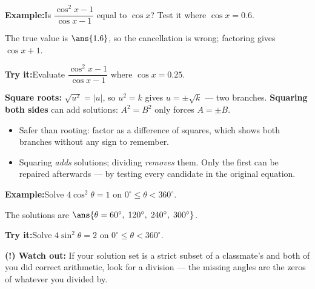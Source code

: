 \documentclass[12pt]{article}
\begin{document}
\begin{examplebox}
\textbf{Example:}\quad Is $\dfrac{\cos^2 x - 1}{\cos x - 1}$ equal to $\cos x$?
Test it where $\cos x = 0.6$.

The true value is $\ans{1.6}$, so the cancellation is wrong; factoring gives
$\cos x + 1$.
\end{examplebox}

\begin{tryitbox}
\textbf{Try it:}\quad Evaluate $\dfrac{\cos^2 x - 1}{\cos x - 1}$ where
$\cos x = 0.25$.\\[2pt]
\end{tryitbox}


\begin{formulabox}
\textbf{Square roots:} $\sqrt{u^2} = |u|$, so $u^2 = k$ gives
$u = \pm\sqrt{k}$ --- two branches. \qquad
\textbf{Squaring both sides} can add solutions: $A^2 = B^2$ only forces
$A = \pm B$.
\begin{itemize}[leftmargin=0.8cm, itemsep=1pt, topsep=2pt]
  \item Safer than rooting: factor as a difference of squares, which shows both
        branches without any sign to remember.
  \item Squaring \emph{adds} solutions; dividing \emph{removes} them. Only the
        first can be repaired afterwards --- by testing every candidate in the
        original equation.
\end{itemize}
\end{formulabox}

\begin{examplebox}
\textbf{Example:}\quad Solve $4\cos^2\theta = 1$ on
$0^\circ \le \theta < 360^\circ$.

The solutions are $\ans{\theta = 60^\circ,\; 120^\circ,\; 240^\circ,\; 300^\circ}$.
\end{examplebox}

\begin{tryitbox}
\textbf{Try it:}\quad Solve $4\sin^2\theta = 2$ on
$0^\circ \le \theta < 360^\circ$.\\[2pt]
\end{tryitbox}

\begin{watchoutbox}
\textbf{(!) Watch out:} If your solution set is a strict subset of a classmate's
and both of you did correct arithmetic, look for a division --- the missing
angles are the zeros of whatever you divided by.
\end{watchoutbox}
\end{document}
